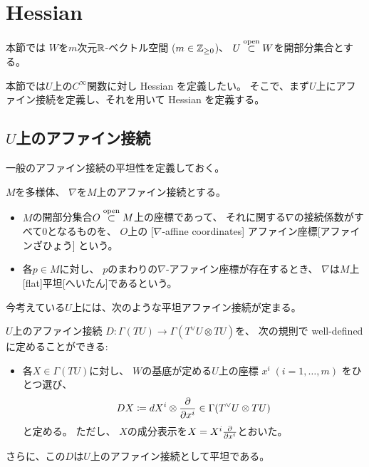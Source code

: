\documentclass[report]{jlreq}
\begin{document}
%
\section{Hessian}

本節では
$W$を$m$次元$\mathbb{R}$-ベクトル空間 ($m \in \mathbb{Z}_{\ge 0}$)、
$U \stackrel{\text{open}}{\subset} W$を開部分集合とする。

本節では$U$上の$C^\infty$関数に対し Hessian を定義したい。
そこで、まず$U$上にアファイン接続を定義し、それを用いて Hessian を定義する。

\subsection{$U$上のアファイン接続}

一般のアファイン接続の平坦性を定義しておく。

\begin{definition}[平坦アファイン接続]
    $M$を多様体、
    $\nabla$を$M$上のアファイン接続とする。
    \begin{itemize}
        \item $M$の開部分集合$O \stackrel{\text{open}}{\subset} M$上の座標であって、
            それに関する$\nabla$の接続係数がすべて$0$となるものを、
            $O$上の
            [$\nabla$-affine coordinates]
                {アファイン座標}[アファインざひょう]
            という。
        \item 各$p \in M$に対し、
            $p$のまわりの$\nabla$-アファイン座標が存在するとき、
            $\nabla$は$M$上
            [flat]{平坦}[へいたん]であるという。
    \end{itemize}
\end{definition}

今考えている$U$上には、次のような平坦アファイン接続が定まる。

\begin{propdef}[$U$上の平坦アファイン接続]
    $U$上のアファイン接続
    $D \colon \Gamma(TU) \to \Gamma(T^\vee U \otimes TU)$を、
    次の規則で well-defined に定めることができる:
    \begin{itemize}
        \item 各$X \in \Gamma(TU)$に対し、
            $W$の基底が定める$U$上の座標
            $x^i \; (i = 1, \dots, m)$
            をひとつ選び、
            \begin{equation}
                \label{eq:def_connection_d}
                DX
                    \coloneqq dX^i \otimes \deldel{x^i}
                    \in \Gamma(T^\vee U \otimes TU)
            \end{equation}
            と定める。
            ただし、
            $X$の成分表示を$X = X^i \deldel{x^i}$とおいた。
    \end{itemize}
    さらに、この$D$は$U$上のアファイン接続として平坦である。
\end{propdef}
\end{document}
